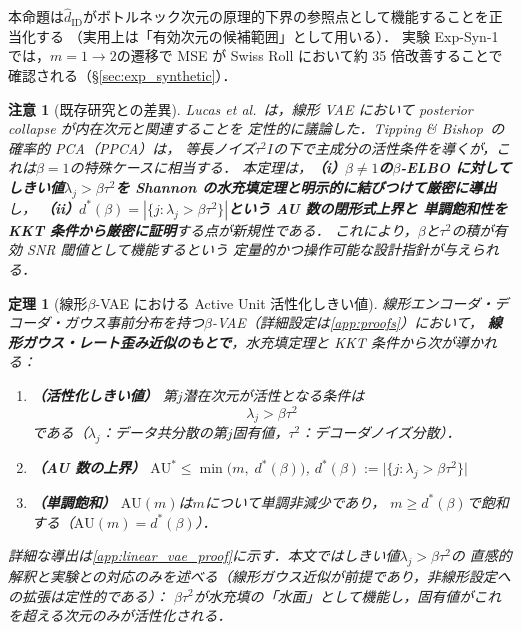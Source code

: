 \documentclass[11pt,a4paper]{jsarticle}
\newtheorem{theorem}{定理}
\newtheorem{remark}{注意}
\begin{document}
本命題は$\hat{d}_\mathrm{ID}$がボトルネック次元の原理的下界の参照点として機能することを正当化する
（実用上は「有効次元の候補範囲」として用いる）．
実験 Exp-Syn-1 では，$m = 1 \to 2$の遷移で MSE が Swiss Roll において約 35 倍改善することで確認される（§\ref{sec:exp_synthetic}）．

\begin{remark}[既存研究との差異]
Lucas et al.~\cite{lucas2019elbo}は，線形 VAE において posterior collapse が内在次元と関連することを
定性的に議論した．Tipping \& Bishop~\cite{tippingbishop1999ppca}の確率的 PCA（PPCA）は，
等長ノイズ$\tau^2 I$の下で主成分の活性条件を導くが，これは$\beta = 1$の特殊ケースに相当する．
本定理は，\textbf{（i）$\beta \neq 1$の$\beta$-ELBO に対してしきい値$\lambda_j > \beta\tau^2$を
Shannon の水充填定理\cite{cover2006elements}と明示的に結びつけて厳密に導出}し，
\textbf{（ii）$d^*(\beta) = |\{j:\lambda_j > \beta\tau^2\}|$という AU 数の閉形式上界と
単調飽和性を KKT 条件から厳密に証明}する点が新規性である．
これにより，$\beta$と$\tau^2$の積が有効 SNR 閾値として機能するという
定量的かつ操作可能な設計指針が与えられる．
\end{remark}

\begin{theorem}[線形$\beta$-VAE における Active Unit 活性化しきい値]\label{thm:linear_vae}
線形エンコーダ・デコーダ・ガウス事前分布を持つ$\beta$-VAE（詳細設定は\ref{app:proofs}）において，
\textbf{線形ガウス・レート歪み近似のもとで}，水充填定理と KKT 条件から次が導かれる：

\begin{enumerate}
  \item \textbf{（活性化しきい値）} 第$j$潜在次元が活性となる条件は
        \begin{equation}
          \lambda_j > \beta \tau^2 \label{eq:au_threshold}
        \end{equation}
        である（$\lambda_j$：データ共分散の第$j$固有値，$\tau^2$：デコーダノイズ分散）．
  \item \textbf{（AU 数の上界）}
        $\mathrm{AU}^* \leq \min\bigl(m,\; d^*(\beta)\bigr)$,\quad
        $d^*(\beta) := \bigl|\{j : \lambda_j > \beta\tau^2\}\bigr|$
  \item \textbf{（単調飽和）}
        $\mathrm{AU}(m)$は$m$について単調非減少であり，
        $m \geq d^*(\beta)$で飽和する（$\mathrm{AU}(m) = d^*(\beta)$）．
\end{enumerate}

\noindent
詳細な導出は\ref{app:linear_vae_proof}に示す．本文ではしきい値$\lambda_j > \beta\tau^2$の
直感的解釈と実験との対応のみを述べる（線形ガウス近似が前提であり，非線形設定への拡張は定性的である）：
$\beta\tau^2$が水充填の「水面」として機能し，固有値がこれを超える次元のみが活性化される．
\end{theorem}
\end{document}
